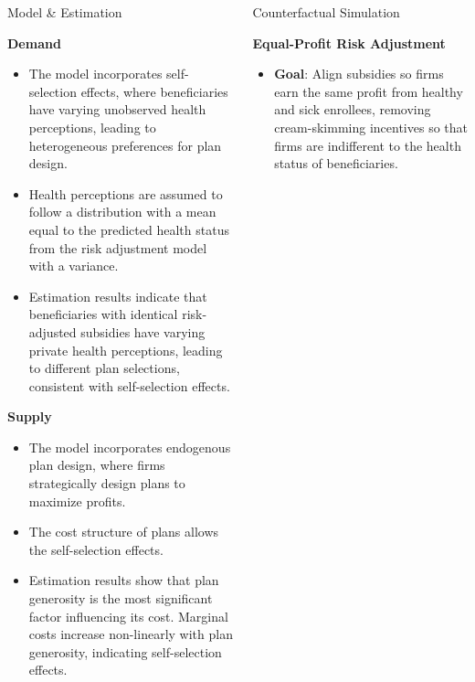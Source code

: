 \documentclass{beamer}
\begin{document}
\begin{frame}[t]
\begin{columns}[t]
\begin{column}{.3\textwidth}
      \begin{block}{Model \& Estimation}
      \begin{center}
      \textbf{Demand}
      \end{center}
      \begin{itemize}
        \item The model incorporates self-selection effects, where beneficiaries have varying unobserved health perceptions, leading to heterogeneous preferences for plan design.
        \item Health perceptions are assumed to follow a distribution with a mean equal to the predicted health status from the risk adjustment model with a variance.
        \item Estimation results indicate that beneficiaries with identical risk-adjusted subsidies have varying private health perceptions, leading to different plan selections, consistent with self-selection effects.     
      \end{itemize}
    
    \begin{center}
      \textbf{Supply}
    \end{center}

    \begin{itemize}
      \item The model incorporates endogenous plan design, where firms strategically design plans to maximize profits.
      \item The cost structure of plans allows the self-selection effects.
      \item Estimation results show that plan generosity is the most significant factor influencing its cost. Marginal costs increase non-linearly with plan generosity, indicating self-selection effects.
    \end{itemize}
      \end{block}

    \end{column}
    \begin{column}{.3 \textwidth}
      \begin{block}{Counterfactual Simulation}
        \begin{center}
          \textbf{Equal-Profit Risk Adjustment}
        \end{center}

        \begin{itemize}
          \item \textbf{Goal}: Align subsidies so firms earn the same profit from healthy and sick enrollees, removing cream-skimming incentives so that firms are indifferent to the health status of beneficiaries.
        \end{itemize}
        

\end{block}
\end{column}
\end{columns}
\end{frame}
\end{document}
